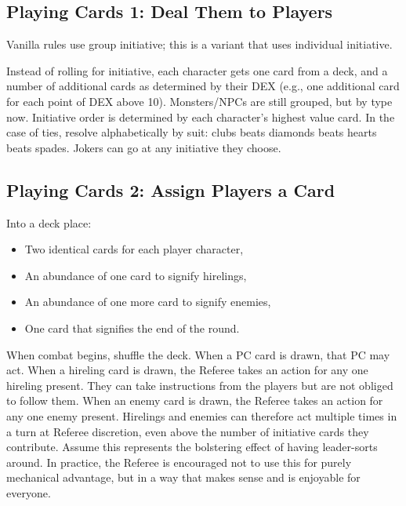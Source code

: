 \documentclass[twoside]{article}
\begin{document}
\subsection*{Playing Cards 1: Deal Them to Players}

Vanilla rules use group initiative; this is a variant that uses individual initiative. 

\bigbreak

Instead of rolling for initiative, each character gets one card from a deck, and a number of additional cards as determined by their DEX (e.g., one additional card for each point of DEX above 10). Monsters/NPCs are still grouped, but by type now. Initiative order is determined by each character's highest value card. In the case of ties, resolve alphabetically by suit: clubs beats diamonds beats hearts beats spades. Jokers can go at any initiative they choose.

\subsection*{Playing Cards 2: Assign Players a Card}

Into a deck place:

\begin{itemize}[nosep]
\item Two identical cards for each player character,
\item An abundance of one card to signify hirelings,
\item An abundance of one more card to signify enemies,
\item One card that signifies the end of the round.
\end{itemize}

When combat begins, shuffle the deck. When a PC card is drawn, that PC may act. When a hireling card is drawn, the Referee takes an action for any one hireling present. They can take instructions from the players but are not obliged to follow them. When an enemy card is drawn, the Referee takes an action for any one enemy present. Hirelings and enemies can therefore act multiple times in a turn at Referee discretion, even above the number of initiative cards they contribute. Assume this represents the bolstering effect of having leader-sorts around. In practice, the Referee is encouraged not to use this for purely mechanical advantage, but in a way that makes sense and is enjoyable for everyone.
\end{document}
